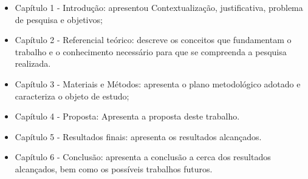 \begin{itemize}

        \item  Capítulo 1 - Introdução: apresentou Contextualização, justificativa, problema de pesquisa e objetivos;

        \item Capítulo 2 - Referencial teórico: descreve os conceitos que fundamentam o trabalho e o conhecimento necessário para que se compreenda a pesquisa realizada.
        \item Capítulo 3 - Materiais e Métodos: apresenta o plano metodológico adotado e caracteriza o objeto de estudo;

        \item Capítulo 4 - Proposta: Apresenta a proposta deste trabalho.

        \item Capítulo 5 - Resultados finais: apresenta os resultados alcançados.

        \item Capítulo 6 - Conclusão: apresenta a conclusão a cerca dos resultados alcançados, bem como os possíveis trabalhos futuros.
          
\end{itemize}
